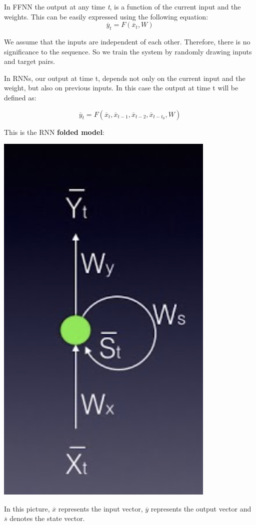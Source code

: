 In FFNN the output at any time \textit{t}, is a function of the current input and the weights. This can be easily expressed using the following equation: 
\begin{equation}
    \overline{y}_t = F(\overline{x}_t, W)
\end{equation}

We assume that the inputs are independent of each other. Therefore, there is no significance to the sequence. So we train the system by randomly drawing inputs and target pairs. \newline

In RNNs, our output at time t, depends not only on the current input and the weight, but also on previous inputs. In this case the output at time t will be defined as:

\begin{equation}
    \overline{y}_t = F(\overline{x}_t, \overline{x}_{t-1}, \overline{x}_{t-2}, \overline{x}_{t-t_0}, W)
\end{equation}

This is the RNN \textbf{folded model}:

\includegraphics[width=0.5\linewidth]{img//rnn//intro/screen-shot-2017-11-06-at-2.09.07-pm.png}

In this picture, \(\overline{x}\) represents the input vector, \(\overline{y}\) represents the output vector and \(\overline{s}\) denotes the state vector. \newline


